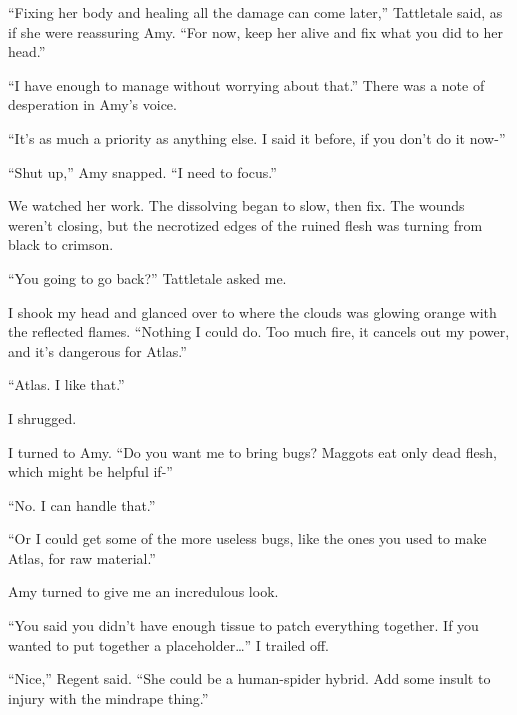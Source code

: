 ``Fixing her body and healing all the damage can come later,'' Tattletale said, as if she were reassuring Amy.  ``For now, keep her alive and fix what you did to her head.''



``I have enough to manage without worrying about that.''  There was a note of desperation in Amy's voice.



``It's as much a priority as anything else.  I said it before, if you don't do it now-''



``Shut up,'' Amy snapped.  ``I need to focus.''



We watched her work.  The dissolving began to slow, then fix.  The wounds weren't closing, but the necrotized edges of the ruined flesh was turning from black to crimson.



``You going to go back?''  Tattletale asked me.



I shook my head and glanced over to where the clouds was glowing orange with the reflected flames.  ``Nothing I could do.  Too much fire, it cancels out my power, and it's dangerous for Atlas.''



``Atlas.  I like that.''



I shrugged.



I turned to Amy.  ``Do you want me to bring bugs?  Maggots eat only dead flesh, which might be helpful if-''



``No.  I can handle that.''



``Or I could get some of the more useless bugs, like the ones you used to make Atlas, for raw material.''



Amy turned to give me an incredulous look.



``You said you didn't have enough tissue to patch everything together.  If you wanted to put together a placeholder\ldots''  I trailed off.



``Nice,'' Regent said.  ``She could be a human-spider hybrid.  Add some insult to injury with the mindrape thing.''



